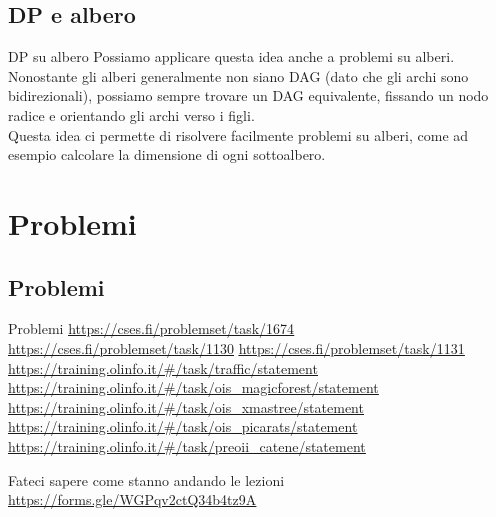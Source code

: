 \documentclass[compress]{beamer}
\begin{document}
\subsection{DP e albero}
\begin{frame}{DP su albero}
    Possiamo applicare questa idea anche a problemi su alberi.\\
    \vfill
    \pause
    Nonostante gli alberi generalmente non siano DAG (dato che gli archi sono bidirezionali), possiamo sempre trovare un DAG equivalente,
    fissando un nodo radice e orientando gli archi verso i figli.\\
    \vfill
    \pause
    Questa idea ci permette di risolvere facilmente problemi su alberi, come ad esempio calcolare la dimensione di ogni sottoalbero.
\end{frame}

\section{Problemi}
\subsection{Problemi}
\begin{frame}{Problemi}
    \underline{\url{https://cses.fi/problemset/task/1674}}
    \underline{\url{https://cses.fi/problemset/task/1130}}
    \underline{\url{https://cses.fi/problemset/task/1131}}
    \underline{\url{https://training.olinfo.it/\#/task/traffic/statement}}
    \underline{\url{https://training.olinfo.it/\#/task/ois_magicforest/statement}}
    \underline{\url{https://training.olinfo.it/\#/task/ois_xmastree/statement}}
    \underline{\url{https://training.olinfo.it/\#/task/ois_picarats/statement}}
    \underline{\url{https://training.olinfo.it/\#/task/preoii_catene/statement}}
\end{frame}

\begin{frame}
    \begin{block}{}
        \begin{center}
        Fateci sapere come stanno andando le lezioni \\
        \underline{\url{https://forms.gle/WGPqv2ctQ34b4tz9A}}
        \end{center}
    \end{block}
\end{frame}
\end{document}
